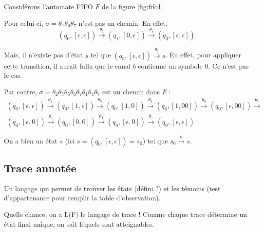 \begin{example}
  Considérons l'automate FIFO $F$ de la figure \ref{fig:fifo1}.

  Pour celui-ci, $\sigma=\theta_1\theta_4\theta_7$ n'est pas un chemin. En effet,
  $$
  (q_0,[\epsilon,\epsilon])\xrightarrow{\theta_1}(q_1,[0,\epsilon])\xrightarrow{\theta_4}(q_3,[\epsilon,\epsilon])
  $$

  Mais, il n'existe pas d'état $s$ tel que $(q_3,[\epsilon,\epsilon])\xrightarrow{\theta_7}s$. En effet, pour appliquer cette transition, il aurait fallu que le canal $b$ contienne un symbole $0$. Ce n'est pas le cas.


  Par contre, $\sigma=\theta_2\theta_5\theta_5\theta_6\theta_7\theta_1\theta_4\theta_7$ est un chemin dans $F$ :
  \begin{equation*}
    \begin{gathered}
      (q_0,[\epsilon,\epsilon])\xrightarrow{\theta_2}
      (q_0,[1,\epsilon])\xrightarrow{\theta_5}
      (q_0,[1,0])\xrightarrow{\theta_5}
      (q_0,[1,00])\xrightarrow{\theta_6}
      (q_0,[\epsilon,00])\xrightarrow{\theta_7}\\
      (q_0,[\epsilon,0])\xrightarrow{\theta_1}
      (q_0,[0,0])\xrightarrow{\theta_4}
      (q_0,[\epsilon,0])\xrightarrow{\theta_7}
      (q_0,[\epsilon,\epsilon])
    \end{gathered}
  \end{equation*}

  On a bien un état $s$ (ici $s=(q_0,[\epsilon,\epsilon])=s_0$) tel que $s_0\xrightarrow{\sigma}s$.

\end{example}




\subsection{Trace annotée}

Un langage qui permet de trouver les états  (défini ?) et les témoins (test d'appartenance pour remplir la table d'observation).

Quelle chance, on a L(F) le langage de trace ! Comme chaque trace détermine un état final unique, on sait lequels sont atteignables.

